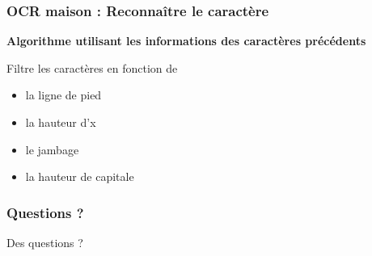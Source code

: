 \documentclass[xcolor=dvipsnames]{beamer}
\begin{document}
\begin{frame}
  \frametitle{OCR maison : Reconnaître le caractère}

  \begin{center}\begin{alertblock}{}
    \begin{center}\textbf{\Large Algorithme utilisant les informations des caractères précédents}\end{center}
  \end{alertblock}\end{center}
  
  Filtre les caractères en fonction de

  \begin{itemize}
    \item<2-> la ligne de pied
    \item<3-> la hauteur d'x
    \item<4-> le jambage
    \item<5-> la hauteur de capitale
  \end{itemize}

  
\end{frame}


\begin{frame}
  \frametitle{Questions ?}

  \begin{alertblock}{}\begin{center}
    Des questions ?
  \end{center}\end{alertblock}
  
\end{frame}

  
\end{document}
